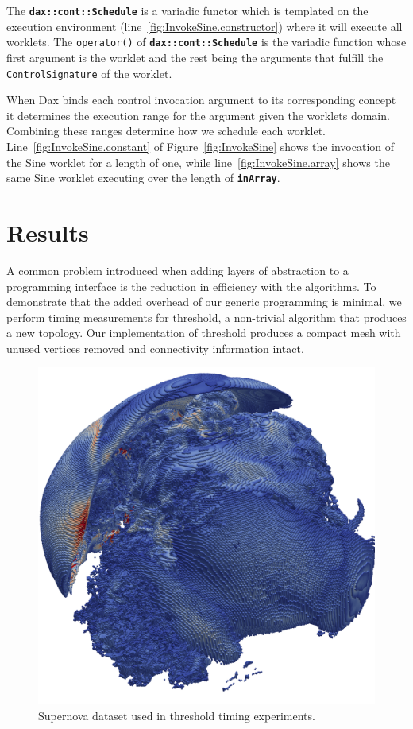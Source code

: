 \documentclass[conference]{IEEEtran}
\newcommand{\Ci}[1]{{\textbf{#1}}} %
\newcommand{\Cu}[1]{{\color{gray}\textbf{#1}}} %
\newcommand{\Code}[1]{{\small\texttt{#1}}}
\begin{document}
The \Code{\Ci{dax::cont::Schedule}} is a variadic functor which is templated on the
execution environment (line~\ref{fig:InvokeSine.constructor}) where it will
execute all worklets. The \Code{operator()} of \Code{\Ci{dax::cont::Schedule}} is the variadic function
whose first argument is the worklet and the rest being the arguments that
fulfill the \Code{ControlSignature} of the worklet.

When Dax binds each control invocation argument to its corresponding concept it determines
the execution range for the argument given the worklets domain. Combining these ranges determine
how we schedule each worklet. Line~\ref{fig:InvokeSine.constant} of Figure~\ref{fig:InvokeSine} shows
the invocation of the Sine worklet for a length of one, while line~\ref{fig:InvokeSine.array}
shows the same Sine worklet executing over the length of \Code{\Cu{inArray}}.

\section{Results}

\noindent
A common problem introduced when adding layers of abstraction to a
programming interface is the reduction in efficiency with the algorithms.
To demonstrate that the added overhead of our generic programming is
minimal, we perform timing measurements for threshold, a non-trivial
algorithm that produces a new topology.  Our implementation of threshold
produces a compact mesh with unused vertices removed and connectivity
information intact.

\begin{figure}[ht]
  \centering
  \includegraphics[width=\linewidth]{images/SupernovaThreshold}
  \caption{Supernova dataset used in threshold timing experiments.}
  \label{fig:Supernova}
\end{figure}
\end{document}
